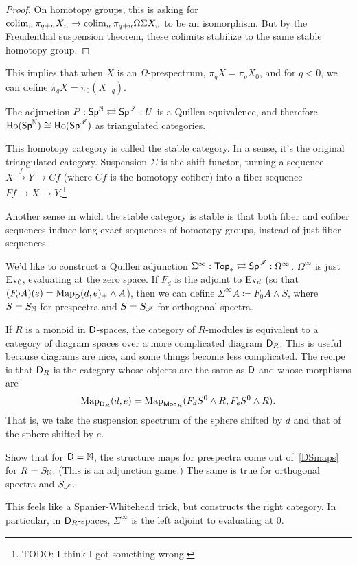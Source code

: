 \begin{proof}
On homotopy groups, this is asking for $\operatorname*{colim}_n\pi_{q+n} X_n\to\operatorname*{colim}_n\pi_{q+n}\Omega\Sigma X_n$ to be an
isomorphism. But by the Freudenthal suspension theorem, these colimits stabilize to the same stable homotopy group.
\end{proof}
This implies that when $X$ is an $\Omega$-prespectrum, $\pi_q X = \pi_q X_0$, and for $q < 0$, we can define $\pi_q
X =\pi_0(X_{-q})$.
\begin{thm}
The adjunction $P: \mathsf{Sp}^\mathbb N\rightleftarrows \mathsf{Sp}^\mathscr I: U$ is a Quillen equivalence, and therefore
$\operatorname{Ho}(\mathsf{Sp}^\mathbb N)\cong\operatorname{Ho}(\mathsf{Sp}^\mathscr I)$ as triangulated categories.
\end{thm}
This homotopy category is called the stable category. In a sense, it's the original triangulated category.
Suspension $\Sigma$ is the shift functor, turning a sequence $X\stackrel f\to Y\to Cf$ (where $Cf$ is the homotopy
cofiber) into a fiber sequence $Ff\to X\to Y$.\footnote{{\color{red}TODO}: I think I got something wrong.}

Another sense in which the stable category is stable is that both fiber and cofiber sequences induce long exact
sequences of homotopy groups, instead of just fiber sequences.

We'd like to construct a Quillen adjunction $\Sigma^\infty:\mathsf{Top}_*\rightleftarrows\mathsf{Sp}^\mathscr I: \Omega^\infty$.
$\Omega^\infty$ is just $\operatorname{Ev}_0$, evaluating at the zero space. If $F_d$ is the adjoint to $\operatorname{Ev}_d$ (so that
$(F_dA)(e) = \operatorname{Map}_\mathsf D(d, e)_+\wedge A$), then we can define $\Sigma^\infty A\coloneqq F_0A\wedge S$, where $S =
S_\mathbb N$ for prespectra and $S = S_\mathscr I$ for orthogonal spectra.

If $R$ is a monoid in $\mathsf D$-spaces, the category of $R$-modules is equivalent to a category of diagram spaces over
a more complicated diagram $\mathsf D_R$. This is useful because diagrams are nice, and some things become less
complicated. The recipe is that $\mathsf D_R$ is the category whose objects are the same as $\mathsf D$ and whose morphisms are
\begin{equation}
\label{DSmaps}
\operatorname{Map}_{\mathsf D_R}(d,e) = \operatorname{Map}_{\mathsf{Mod}_R}(F_d S^0\wedge R, F_eS^0\wedge R).
\end{equation}
That is, we take the suspension spectrum of the sphere shifted by $d$ and that of the sphere shifted by $e$.
\begin{ex}
Show that for $\mathsf D = \mathbb N$, the structure maps for prespectra come out of~\eqref{DSmaps} for $R = S_\mathbb N$. (This is an
adjunction game.) The same is true for orthogonal spectra and $S_\mathscr I$.
\end{ex}
This feels like a Spanier-Whitehead trick, but constructs the right category. In particular, in $\mathsf D_R$-spaces,
$\Sigma^\infty$ is the left adjoint to evaluating at $0$.

